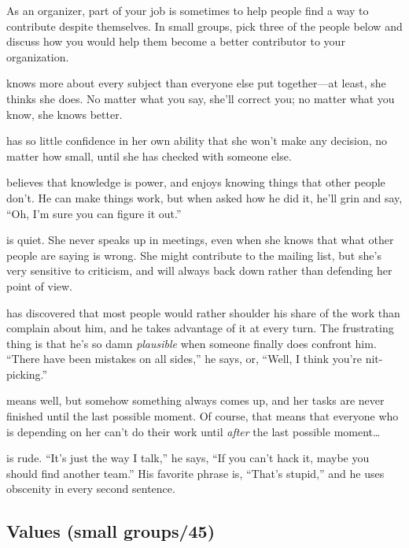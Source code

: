 As an organizer, part of your job is sometimes to help people find a way
to contribute despite themselves. In small groups, pick three of the
people below and discuss how you would help them become a better
contributor to your organization.

\begin{description}
\tightlist
\item[Anna]
knows more about every subject than everyone else put together---at
least, she thinks she does. No matter what you say, she'll correct
you; no matter what you know, she knows better.
\item[Catherine]
has so little confidence in her own ability that she won't make any
decision, no matter how small, until she has checked with someone
else.
\item[Frank]
believes that knowledge is power, and enjoys knowing things that
other people don't. He can make things work, but when asked how he
did it, he'll grin and say, ``Oh, I'm sure you can figure it out.''
\item[Hediyeh]
is quiet. She never speaks up in meetings, even when she knows that
what other people are saying is wrong. She might contribute to the
mailing list, but she's very sensitive to criticism, and will always
back down rather than defending her point of view.
\item[Kenny]
has discovered that most people would rather shoulder his share of
the work than complain about him, and he takes advantage of it at
every turn. The frustrating thing is that he's so damn \emph{plausible}
when someone finally does confront him. ``There have been mistakes on
all sides,'' he says, or, ``Well, I think you're nit-picking.''
\item[Melissa]
means well, but somehow something always comes up, and her tasks are
never finished until the last possible moment. Of course, that means
that everyone who is depending on her can't do their work until
\emph{after} the last possible moment\ldots{}
\item[Raj]
is rude. ``It's just the way I talk,'' he says, ``If you can't hack it,
maybe you should find another team.'' His favorite phrase is, ``That's
stupid,'' and he uses obscenity in every second sentence.
\end{description}

\subsection{Values (small groups/45)}\label{values-small-groups45}

